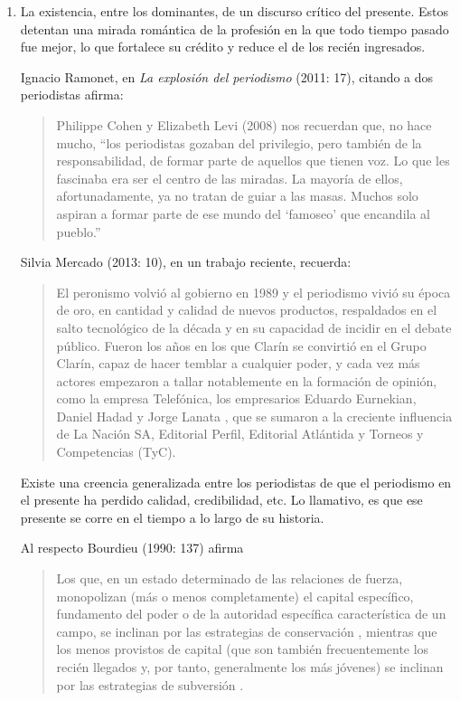 \begin{enumerate} [label=\alph*.]
\item
La existencia, entre los dominantes, de un discurso crítico del presente. Estos detentan una mirada romántica de la profesión en la que todo tiempo pasado fue mejor, lo que fortalece su crédito y reduce el de los recién ingresados.

Ignacio Ramonet, en \emph{La explosión del periodismo} (2011: 17), citando a dos periodistas afirma:

\begin{quote}
	Philippe Cohen y Elizabeth Levi (2008) nos recuerdan que, no hace mucho, \enquote{los periodistas gozaban del privilegio, pero también de la responsabilidad, de formar parte de aquellos que tienen voz. Lo que les fascinaba era ser el centro de las miradas. La mayoría de ellos, afortunadamente, ya no tratan de guiar a las masas. Muchos solo aspiran a formar parte de ese mundo del \enquote{famoseo} que encandila al pueblo.}
\end{quote}


Silvia Mercado (2013: 10), en un trabajo reciente, recuerda:

\begin{quote}
	El peronismo volvió al gobierno en 1989 y el periodismo vivió su época de oro, en cantidad y calidad de nuevos productos, respaldados en el salto tecnológico de la década y en su capacidad de incidir en el debate público. Fueron los años en los que Clarín se convirtió en el Grupo Clarín, capaz de hacer temblar a cualquier poder, y cada vez más actores empezaron a tallar notablemente en la formación de opinión, como la empresa Telefónica, los empresarios Eduardo Eurnekian, Daniel Hadad y Jorge Lanata , que se sumaron a la creciente influencia de La Nación SA, Editorial Perfil, Editorial Atlántida y Torneos y Competencias (TyC).
\end{quote}

Existe una creencia generalizada entre los periodistas de que el periodismo en el presente ha perdido calidad, credibilidad, etc. Lo llamativo, es que ese presente se corre en el tiempo a lo largo de su historia.

Al respecto Bourdieu (1990: 137) afirma

\begin{quote}
	Los que, en un estado determinado de las relaciones de fuerza, monopolizan (más o menos completamente) el capital específico, fundamento del poder o de la autoridad específica característica de un campo, se inclinan por las estrategias de conservación , mientras que los menos provistos de capital (que son también frecuentemente los recién llegados y, por tanto, generalmente los más jóvenes) se inclinan por las estrategias de subversión .
\end{quote}



\end{enumerate}
